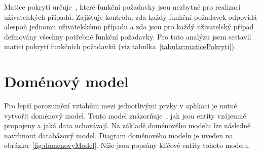 Matice pokrytí určuje~\cite{uml_2007}, které funkční požadavky jsou nezbytné pro realizaci uživatelských případů. 
Zajišťuje kontrolu, zda každý funkční požadavek odpovídá alespoň jednomu uživatelskému případu a zda jsou pro každý uživatelský případ definovány všechny potřebné funkční požadavky. 
Pro tuto analýzu jsem sestavil matici pokrytí funkčních požadavků (viz tabulka~\ref{tabular:maticePokryti}).

\section{Doménový model}\label{text:analyza/datovymodel}

Pro lepší porozumění vztahům mezi jednotlivými prvky v aplikaci je nutné vytvořit doménový model. 
Tento model znázorňuje~\cite{uml_2007}, jak jsou entity vzájemně propojeny a jaká data uchovávají. 
Na základě doménového modelu lze následně navrhnout databázový model. 
Diagram doménového modelu je uveden na obrázku~\ref{fig:domenovyModel}. 
Níže jsou popsány klíčové entity tohoto modelu.

